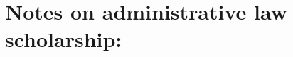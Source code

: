 \documentclass{article}
\begin{document}
\section*{Notes on administrative law scholarship:}
\doublespacing


\newpage
\singlespace
\small
 

\end{document}
